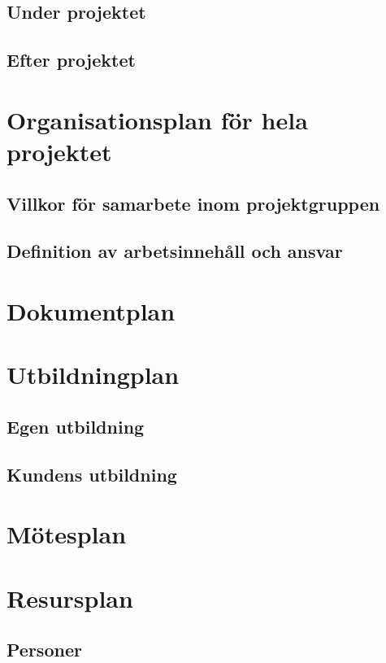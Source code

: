 \documentclass[a4paper,12pt]{article}
\begin{document}
\subsection{Under projektet}
\subsection{Efter projektet}
\section{Organisationsplan för hela projektet}	%

\subsection{Villkor för samarbete inom projektgruppen}

\subsection{Definition av arbetsinnehåll och ansvar}
\section{Dokumentplan}	%


\section{Utbildningplan}	%
\subsection{Egen utbildning}
\subsection{Kundens utbildning}
\section{Mötesplan}
\section{Resursplan}	%
\subsection{Personer}
\end{document}
